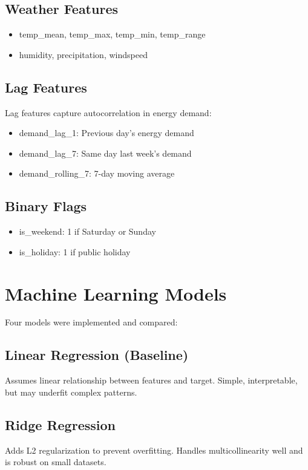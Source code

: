     \subsection{Weather Features}
    \begin{itemize}
        \item temp\_mean, temp\_max, temp\_min, temp\_range
        \item humidity, precipitation, windspeed
    \end{itemize}

    \subsection{Lag Features}
    Lag features capture autocorrelation in energy demand:
    \begin{itemize}
        \item demand\_lag\_1: Previous day's energy demand
        \item demand\_lag\_7: Same day last week's demand
        \item demand\_rolling\_7: 7-day moving average
    \end{itemize}

    \subsection{Binary Flags}
    \begin{itemize}
        \item is\_weekend: 1 if Saturday or Sunday
        \item is\_holiday: 1 if public holiday
    \end{itemize}

    \section{Machine Learning Models}
    Four models were implemented and compared:

    \subsection{Linear Regression (Baseline)}
    Assumes linear relationship between features and target. Simple, interpretable, but may underfit complex patterns.

    \subsection{Ridge Regression}
    Adds L2 regularization to prevent overfitting. Handles multicollinearity well and is robust on small datasets.

